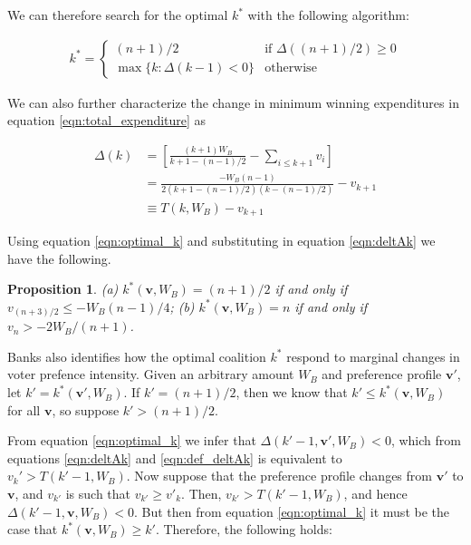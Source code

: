 \documentclass[12pt,a4paper]{article}
\newtheorem{proposition}{Proposition}
\begin{document}
We can therefore search for the optimal $k^*$ with the following algorithm:

\begin{align}
    \label{eqn:optimal_k}
    k^* = 
    \begin{cases}
        (n + 1)/2 & \text{if } \Delta((n + 1)/2) \geq 0 \\
        \max\{k : \Delta(k - 1) < 0\} & \text{otherwise}
    \end{cases}
\end{align}

We can also further characterize the change in minimum winning expenditures in equation \ref{eqn:total_expenditure} as

\begin{align}
    \Delta(k)  & = \left[\frac{(k + 1)W_B}{k + 1 - (n - 1)/2} - \sum_{i \leq k + 1}v_i \right]\\
    \label{eqn:deltAk}
    & = \frac{-W_B (n - 1)}{2(k + 1 - (n - 1)/2)(k - (n - 1)/2)} - v_{k + 1}\\
    \label{eqn:def_deltAk}
    & \equiv T(k, W_B) - v_{k + 1}
\end{align}

Using equation \ref{eqn:optimal_k} and substituting in equation \ref{eqn:deltAk} we have the following.

\begin{proposition}
    (a) $k^*(\mathbf{v}, W_B) = (n + 1)/2$ if and only if $v_{(n + 3)/2} \leq -W_B(n - 1)/4$; (b) $k^*(\mathbf{v}, W_B) = n$ if and only if $v_n > -2W_B/(n + 1)$.
\end{proposition}

Banks also identifies how the optimal coalition $k^*$ respond to marginal changes in voter prefence intensity. Given an arbitrary amount $W_B$ and preference profile $\mathbf{v}'$, let $k' = k^*(\mathbf{v'}, W_B)$. If $k' = (n + 1)/2$, then we know that $k' \leq k^*(\mathbf{v}, W_B)$ for all $\mathbf{v}$, so suppose $k' > (n + 1)/2$.

From equation \ref{eqn:optimal_k} we infer that $\Delta(k' - 1, \mathbf{v}', W_B) < 0$, which from equations \ref{eqn:deltAk} and \ref{eqn:def_deltAk} is equivalent to $v_k' > T(k' - 1, W_B)$. Now suppose that the preference profile changes from $\mathbf{v}'$ to $\mathbf{v}$, and $v_{k'}$ is such that $v_{k'} \geq v'_k$. Then, $v_{k'} > T(k' - 1, W_B)$, and hence $\Delta(k' - 1, \mathbf{v}, W_B) < 0$. But then from equation \ref{eqn:optimal_k} it must be the case that $k^*(\mathbf{v}, W_B) \geq k'$. Therefore, the following holds:
\end{document}
